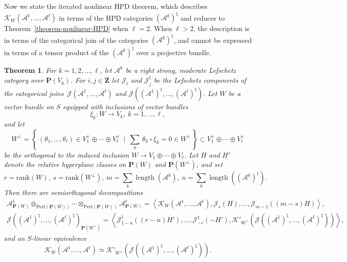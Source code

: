 \documentclass[11pt, reqno]{amsart}
\numberwithin{equation}{section}
\theoremstyle{plain}
\newtheorem{theorem}{Theorem}[section]
\theoremstyle{definition}
\newcommand{\st}{\mid}
\newcommand{\set}[1]{\left\{ \, #1 \, \right\}}
\newcommand{\Perf}{\mathrm{Perf}}
\DeclareMathOperator{\length}{\mathrm{length}}
\newcommand{\hpd}{{\natural}}
\newcommand{\svee}{\scriptscriptstyle\vee}
\newcommand{\cJd}{\mathcal{J}^{\hpd}}
\newcommand{\llangle}{\left \langle}
\newcommand{\rrangle}{\right \rangle}
\newcommand{\vV}{V^{\svee}}
\newcommand{\rank}{\mathrm{rank}}
\newcommand{\cA}{\mathcal{A}}
\newcommand{\cJ}{\mathcal{J}}
\newcommand{\cK}{\mathcal{K}}
\newcommand{\bZ}{\mathbf{Z}}
\newcommand{\bP}{\mathbf{P}}
\begin{document}
Now we state the iterated nonlinear HPD theorem, which 
describes $\cK_W(\cA^1, \dots, \cA^\ell)$ in terms of the 
HPD categories $(\cA^k)^{\hpd}$ and reduces to Theorem~\ref{theorem-nonlinear-HPD} 
when $\ell = 2$. 
When $\ell > 2$, the description is in terms 
of the categorical join of the categories $(\cA^k)^{\hpd}$, and cannot be 
expressed in terms of a tensor product of the $(\cA^k)^{\hpd}$
over a projective bundle. 

\begin{theorem}
\label{theorem-iterated-nonlinear-HPD} 
For $k=1, 2, \dots, \ell$, let $\cA^k$ be a 
right strong, moderate Lefschetz category over $\bP(V_k)$. 
For $i , j \in \bZ$ let $\cJ_i$ and $\cJd_j$ be the Lefschetz 
components of the categorical joins~$\cJ(\cA^1, \dots, \cA^\ell)$ and $\cJ((\cA^1)^{\hpd}, \dots, (\cA^\ell)^{\hpd})$. 
Let $W$ be a vector bundle on $S$ equipped with inclusions of vector bundles 
\begin{equation*}
\xi_{k} \colon W \to V_k, ~ k = 1, \dots, \ell, 
\end{equation*} 
and let  
\begin{equation*}
W^{\perp} = \set{ 
(\theta_1, \dots, \theta_\ell) \in V_1^{\svee} \oplus \cdots \oplus V_{\ell}^{\svee} ~ \st ~
\textstyle{\sum_k} \, \theta_k \circ \xi_k = 0 \in W^{\svee} } \subset \vV_1 \oplus \cdots \oplus \vV_\ell 
\end{equation*}
be the orthogonal to the induced inclusion $W \to V_1 \oplus \cdots \oplus V_\ell$. 
Let $H$ and $H'$ denote the relative hyperplane classes on 
$\bP(W)$ and $\bP(W^{\perp})$, and set 
\begin{equation*}
r = \rank(W), ~ s = \rank(W^{\perp}), ~ m = \sum_k \length(\cA^k), ~ n = \sum_{k} \length((\cA^k)^\hpd) . 
\end{equation*}
Then there are semiorthogonal decompositions 
\begin{align*}
\cA^1_{\bP(W)} \otimes_{\Perf(\bP(W))} \cdots \otimes_{\Perf(\bP(W))} \cA^\ell_{\bP(W)} = 
\llangle \cK_W(\cA^1, \dots, \cA^\ell), \cJ_{s}(H), \dots, \cJ_{m-1}((m-s)H) \rrangle ,    \\ 
\cJ((\cA^1)^{\hpd}, \dots, (\cA^{\ell})^{\hpd})_{\bP(W^{\perp})} = 
\llangle \cJd_{1-n}((r - n)H'), \dots, \cJd_{-r}(-H'), \cK'_{W^{\perp}}(\cJ((\cA^1)^{\hpd}, \dots, (\cA^\ell)^{\hpd})) \rrangle, 
\end{align*} 
and an $S$-linear equivalence 
\begin{equation*}
\cK_W(\cA^1, \dots, \cA^\ell) \simeq  \cK'_{W^{\perp}}(\cJ((\cA^1)^{\hpd}, \dots, (\cA^\ell)^{\hpd})) . 
\end{equation*}
\end{theorem}
\end{document}
